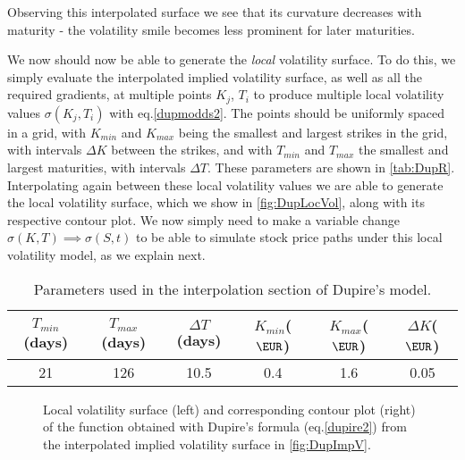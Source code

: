 Observing this interpolated surface we see that its curvature decreases with maturity - the volatility smile becomes less prominent for later maturities.


We now should now be able to generate the \emph{local} volatility surface. To do this, we simply evaluate the interpolated implied volatility surface, as well as all the required gradients, at multiple points $K_j$, $T_i$ to produce multiple local volatility values $\sigma(K_j,T_i)$ with eq.\eqref{dupmodds2}. The points should be uniformly spaced in a grid, with $K_{min}$ and $K_{max}$ being the smallest and largest strikes in the grid, with intervals $\Delta K$ between the strikes, and with $T_{min}$ and $T_{max}$ the smallest and largest maturities, with intervals $\Delta T$. These parameters are shown in \autoref{tab:DupR}.
Interpolating again between these local volatility values we are able to generate the local volatility surface, which we show in \autoref{fig:DupLocVol}, along with its respective contour plot. We now simply need to make a variable change $\sigma(K,T)\implies \sigma(S,t)$ to be able to simulate stock price paths under this local volatility model, as we explain next.


\begin{table}[H]
    \centering
        \renewcommand{\arraystretch}{0.8}
\begin{tabular}{@{}cccccc@{}}
\toprule
$T_{min}$(days) & $T_{max}$(days) & $\Delta T$(days) & $K_{min}$($\EUR$) & $K_{max}$($\EUR$) & \multicolumn{1}{c}{$\Delta K$($\EUR$)}\\ \midrule
21 & 126 & 10.5 & 0.4 & 1.6 & \multicolumn{1}{c}{0.05} \\ \bottomrule
\end{tabular}
  \caption[Parameters used in the interpolation section of Dupire's model.]{Parameters used in the interpolation section of Dupire's model.}
  \label{tab:DupR}
\end{table}


\begin{figure}[H]
  \begin{subfigmatrix}{2}
  \end{subfigmatrix}
    \caption[Local volatility surface and corresponding contour plot of the function obtained with Dupire's formula from the interpolated implied volatility surface.]{Local volatility surface (left) and corresponding contour plot (right) of the function obtained with Dupire's formula (eq.\eqref{dupire2}) from the interpolated implied volatility surface in \autoref{fig:DupImpV}.}\label{fig:DupLocVol}
\end{figure}   

